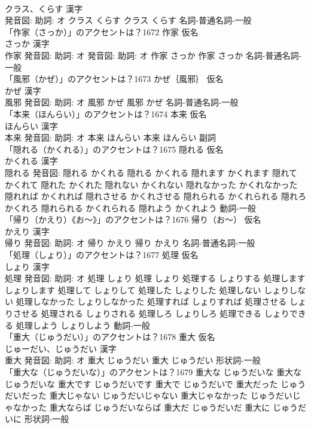 \documentclass[8pt]{extreport}
\begin{document}
\begin{CJK}{UTF8}{min}
\\	クラス、くらす 漢字　
\\	発音図: 助詞: オ	クラス くらす		クラス くらす				名詞-普通名詞-一般 
\\	「作家（さっか）」のアクセントは？1672	作家 仮名　
\\	さっか 漢字　
\\	作家 発音図: 助詞: オ 発音図: 助詞: オ	作家 さっか		作家 さっか				名詞-普通名詞-一般 
\\	「風邪（かぜ）」のアクセントは？1673	かぜ｛風邪｝ 仮名　
\\	かぜ 漢字　
\\	風邪 発音図: 助詞: オ	風邪 かぜ		風邪 かぜ				名詞-普通名詞-一般 
\\	「本来（ほんらい）」のアクセントは？1674	本来 仮名　
\\	ほんらい 漢字　
\\	本来 発音図: 助詞: オ	本来 ほんらい		本来 ほんらい				副詞 
\\	「隠れる（かくれる）」のアクセントは？1675	隠れる 仮名　
\\	かくれる 漢字　
\\	隠れる 発音図:	隠れる かくれる		隠れる かくれる 隠れます かくれます 隠れて かくれて 隠れた かくれた 隠れない かくれない 隠れなかった かくれなかった 隠れれば かくれれば 隠れさせる かくれさせる 隠れられる かくれられる 隠れろ かくれろ 隠れられる かくれられる 隠れよう かくれよう				動詞-一般 
\\	「帰り（かえり）《お〜》」のアクセントは？1676	帰り（お〜） 仮名　
\\	かえり 漢字　
\\	帰り 発音図: 助詞: オ	帰り かえり		帰り かえり				名詞-普通名詞-一般 
\\	「処理（しょり）」のアクセントは？1677	処理 仮名　
\\	しょり 漢字　
\\	処理 発音図: 助詞: オ	処理 しょり		処理 しょり 処理する しょりする 処理します しょりします 処理して しょりして 処理した しょりした 処理しない しょりしない 処理しなかった しょりしなかった 処理すれば しょりすれば 処理させる しょりさせる 処理される しょりされる 処理しろ しょりしろ 処理できる しょりできる 処理しよう しょりしよう				動詞-一般 
\\	「重大（じゅうだい）」のアクセントは？1678	重大 仮名　
\\	じゅーだい、じゅうだい 漢字　
\\	重大 発音図: 助詞: オ	重大 じゅうだい		重大 じゅうだい				形状詞-一般 
\\	「重大な（じゅうだいな）」のアクセントは？1679		重大な じゅうだいな		重大な じゅうだいな 重大です じゅうだいです 重大で じゅうだいで 重大だった じゅうだいだった 重大じゃない じゅうだいじゃない 重大じゃなかった じゅうだいじゃなかった 重大ならば じゅうだいならば 重大だ じゅうだいだ 重大に じゅうだいに				形状詞-一般 

\end{CJK}
\end{document}

